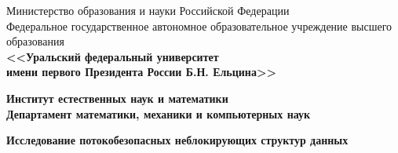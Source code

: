 \documentclass[12pt]{report}
\begin{document}
	
	{\thispagestyle{empty}
		\begin{center}
			\scriptsize Министерство образования и науки Российской Федерации\\
			\scriptsize Федеральное государственное автономное образовательное учреждение высшего образования\\
			\normalsize\bf <<Уральский федеральный университет\\
			\normalsize\bf имени первого Президента России Б.Н. Ельцина>>
		\end{center}
		
		\begin{center}
			\normalsize\bf Институт естественных наук и математики\\
			\normalsize\bf Департамент математики, механики и компьютерных наук\\
		\end{center}
		
		\vspace{3cm}
		
		\begin{center}
			\LARGE\bf Исследование потокобезопасных неблокирующих структур данных
		\end{center}
		
		\vspace{2.5cm}
		
}
\end{document}
